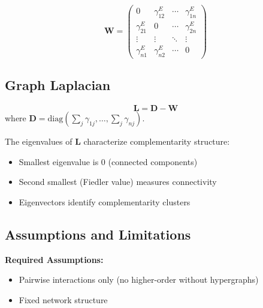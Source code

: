 \begin{definition}
\begin{equation}
\mathbf{W} = \begin{pmatrix}
0 & \gamma^E_{12} & \cdots & \gamma^E_{1n} \\
\gamma^E_{21} & 0 & \cdots & \gamma^E_{2n} \\
\vdots & \vdots & \ddots & \vdots \\
\gamma^E_{n1} & \gamma^E_{n2} & \cdots & 0
\end{pmatrix}
\end{equation}
\end{definition}

\subsection{Graph Laplacian}

\begin{definition}
\begin{equation}
\mathbf{L} = \mathbf{D} - \mathbf{W}
\end{equation}
where $\mathbf{D} = \text{diag}(\sum_j \gamma_{1j}, \ldots, \sum_j \gamma_{nj})$.
\end{definition}

\begin{theorem}
The eigenvalues of $\mathbf{L}$ characterize complementarity structure:
\begin{itemize}
    \item Smallest eigenvalue is 0 (connected components)
    \item Second smallest (Fiedler value) measures connectivity
    \item Eigenvectors identify complementarity clusters
\end{itemize}
\end{theorem}

\subsection{Assumptions and Limitations}

\textbf{Required Assumptions:}
\begin{itemize}
    \item Pairwise interactions only (no higher-order without hypergraphs)
    \item Fixed network structure
\end{itemize}

